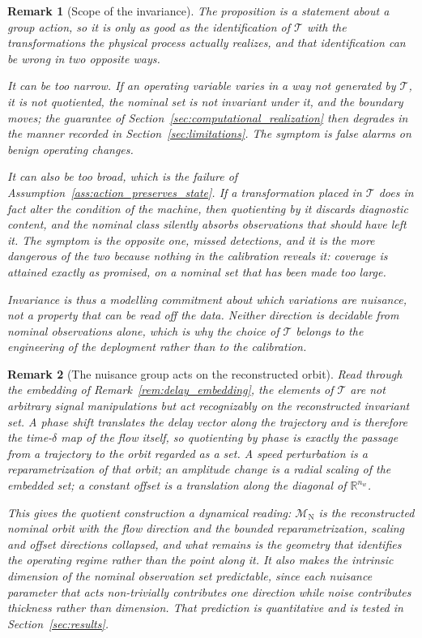 \documentclass[a4paper]{cas-sc}
\newtheorem{remark}{Remark}
\newcommand{\Mnominal}{\ensuremath{\mathcal{M}_{\mathrm{N}}}}
\newcommand{\R}{\ensuremath{\mathbb{R}}}
\begin{document}
\begin{remark}[Scope of the invariance]
\label{rem:boundary_invariance_scope}
The proposition is a statement about a group action, so it is only as good as
the identification of \(\mathcal{T}\) with the transformations the physical
process actually realizes, and that identification can be wrong in two
opposite ways.

It can be too narrow. If an operating variable varies in a way not generated
by \(\mathcal{T}\), it is not quotiented, the nominal set is not invariant
under it, and the boundary moves; the guarantee of
Section~\ref{sec:computational_realization} then degrades in the manner
recorded in Section~\ref{sec:limitations}. The symptom is false alarms on
benign operating changes.

It can also be too broad, which is the failure of
Assumption~\ref{ass:action_preserves_state}. If a transformation placed in
\(\mathcal{T}\) does in fact alter the condition of the machine, then
quotienting by it discards diagnostic content, and the nominal class silently
absorbs observations that should have left it. The symptom is the opposite
one, missed detections, and it is the more dangerous of the two because
nothing in the calibration reveals it: coverage is attained exactly as
promised, on a nominal set that has been made too large.

Invariance is thus a modelling commitment about which variations are nuisance,
not a property that can be read off the data. Neither direction is decidable
from nominal observations alone, which is why the choice of \(\mathcal{T}\)
belongs to the engineering of the deployment rather than to the calibration.
\end{remark}

\begin{remark}[The nuisance group acts on the reconstructed orbit]
\label{rem:nuisance_on_attractor}
Read through the embedding of Remark~\ref{rem:delay_embedding}, the elements
of \(\mathcal{T}\) are not arbitrary signal manipulations but act
recognizably on the reconstructed invariant set. A phase shift translates the
delay vector along the trajectory and is therefore the time-\(\delta\) map of
the flow itself, so quotienting by phase is exactly the passage from a
trajectory to the orbit regarded as a set. A speed perturbation is a
reparametrization of that orbit; an amplitude change is a radial scaling of
the embedded set; a constant offset is a translation along the diagonal of
\(\R^{n_w}\).

This gives the quotient construction a dynamical reading:
\(\Mnominal\) is the reconstructed nominal orbit with the flow direction and
the bounded reparametrization, scaling and offset directions collapsed, and
what remains is the geometry that identifies the operating regime rather than
the point along it. It also makes the intrinsic dimension of the nominal
observation set predictable, since each nuisance parameter that acts
non-trivially contributes one direction while noise contributes thickness
rather than dimension. That prediction is quantitative and is tested in
Section~\ref{sec:results}.
\end{remark}
\end{document}

